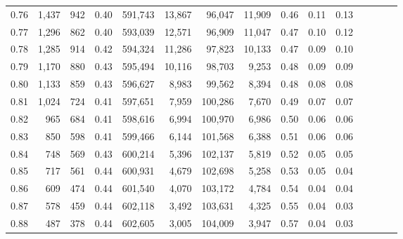 \begin{tabular}{rrrcrrrrrrrrrrr}
0.76 &   1,437 &    942 &                                       0.40 &  591,743 &   13,867 &   96,047 &   11,909 &  0.46 &  0.11 &                         0.13 \\
0.77 &   1,296 &    862 &                                       0.40 &  593,039 &   12,571 &   96,909 &   11,047 &  0.47 &  0.10 &                         0.12 \\
0.78 &   1,285 &    914 &                                       0.42 &  594,324 &   11,286 &   97,823 &   10,133 &  0.47 &  0.09 &                         0.10 \\
0.79 &   1,170 &    880 &                                       0.43 &  595,494 &   10,116 &   98,703 &    9,253 &  0.48 &  0.09 &                         0.09 \\
0.80 &   1,133 &    859 &                                       0.43 &  596,627 &    8,983 &   99,562 &    8,394 &  0.48 &  0.08 &                         0.08 \\
0.81 &   1,024 &    724 &                                       0.41 &  597,651 &    7,959 &  100,286 &    7,670 &  0.49 &  0.07 &                         0.07 \\
0.82 &     965 &    684 &                                       0.41 &  598,616 &    6,994 &  100,970 &    6,986 &  0.50 &  0.06 &                         0.06 \\
0.83 &     850 &    598 &                                       0.41 &  599,466 &    6,144 &  101,568 &    6,388 &  0.51 &  0.06 &                         0.06 \\
0.84 &     748 &    569 &                                       0.43 &  600,214 &    5,396 &  102,137 &    5,819 &  0.52 &  0.05 &                         0.05 \\
0.85 &     717 &    561 &                                       0.44 &  600,931 &    4,679 &  102,698 &    5,258 &  0.53 &  0.05 &                         0.04 \\
0.86 &     609 &    474 &                                       0.44 &  601,540 &    4,070 &  103,172 &    4,784 &  0.54 &  0.04 &                         0.04 \\
0.87 &     578 &    459 &                                       0.44 &  602,118 &    3,492 &  103,631 &    4,325 &  0.55 &  0.04 &                         0.03 \\
0.88 &     487 &    378 &                                       0.44 &  602,605 &    3,005 &  104,009 &    3,947 &  0.57 &  0.04 &                         0.03 \\

\end{tabular}
